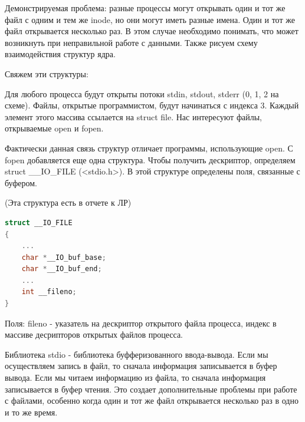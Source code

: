\documentclass[12pt,a4paper]{scrreprt}
\begin{document}
Демонстрируемая проблема: разные процессы могут открывать один и тот же файл с одним и тем же inode, но они могут иметь разные имена. Один и тот же файл открывается несколько раз. В этом случае необходимо понимать, что может возникнуть при неправильной работе с данными. Также рисуем схему взаимодействия структур ядра.

Свяжем эти структуры:

\begin{figure}[!h]
\end{figure}

Для любого процесса будут открыты потоки stdin, stdout, stderr (0, 1, 2 на схеме). Файлы, открытые программистом, будут начинаться с индекса 3. Каждый элемент этого массива ссылается на struct file. Нас интересуют файлы, открываемые open и fopen.

Фактически данная связь структур отличает программы, использующие open. С fopen добавляется еще одна структура. Чтобы получить дескриптор, определяем struct \_\_IO\_FILE (<stdio.h>). В этой структуре определены поля, связанные с буфером. 

(Эта структура есть в отчете к ЛР)

\begin{lstlisting}[language=C]
struct __IO_FILE
{	
	...
	char *__IO_buf_base;
	char *__IO_buf_end;
	...
	int __fileno;
}
\end{lstlisting}

Поля: fileno - указатель на дескриптор открытого файла процесса, индекс в массиве десрипторов открытых файлов процесса.

Библиотека stdio - библиотека буфферизованного ввода-вывода. Если мы осуществляем запись в файл, то сначала информация записывается в буфер вывода. Если мы читаем информацию из файла, то сначала информация записывается в буфер чтения. Это создает дополнительные проблемы при работе с файлами, особенно когда один и тот же файл открывается несколько раз в одно и то же время.
\end{document}
